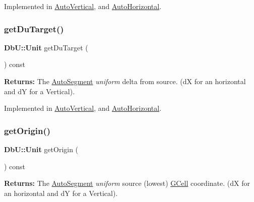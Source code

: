 Implemented in \mbox{\hyperlink{classKatabatic_1_1AutoVertical_a760500b1fd027c71f5362dd8c0b01ea7}{Auto\+Vertical}}, and \mbox{\hyperlink{classKatabatic_1_1AutoHorizontal_a760500b1fd027c71f5362dd8c0b01ea7}{Auto\+Horizontal}}.

\mbox{\label{classKatabatic_1_1AutoSegment_a0644d656eedc71dba2fb3c6c0d83ed3f}} 
\subsubsection{\texorpdfstring{get\+Du\+Target()}{getDuTarget()}}
{\footnotesize\ttfamily \textbf{ Db\+U\+::\+Unit} get\+Du\+Target (\begin{DoxyParamCaption}{ }\end{DoxyParamCaption}) const\hspace{0.3cm}{\ttfamily [pure virtual]}}

{\bfseries Returns\+:} The \mbox{\hyperlink{classKatabatic_1_1AutoSegment}{Auto\+Segment}} {\itshape uniform} delta from source. (dX for an horizontal and dY for a Vertical). 

Implemented in \mbox{\hyperlink{classKatabatic_1_1AutoVertical_a76e349c14c904b3300a15caa1ee8b680}{Auto\+Vertical}}, and \mbox{\hyperlink{classKatabatic_1_1AutoHorizontal_a76e349c14c904b3300a15caa1ee8b680}{Auto\+Horizontal}}.

\mbox{\label{classKatabatic_1_1AutoSegment_ab5fb22520af4b94f2ae984304fa64c26}} 
\subsubsection{\texorpdfstring{get\+Origin()}{getOrigin()}}
{\footnotesize\ttfamily \textbf{ Db\+U\+::\+Unit} get\+Origin (\begin{DoxyParamCaption}{ }\end{DoxyParamCaption}) const\hspace{0.3cm}{\ttfamily [inline]}}

{\bfseries Returns\+:} The \mbox{\hyperlink{classKatabatic_1_1AutoSegment}{Auto\+Segment}} {\itshape uniform} source (lowest) \mbox{\hyperlink{classKatabatic_1_1GCell}{G\+Cell}} coordinate. (dX for an horizontal and dY for a Vertical). 


